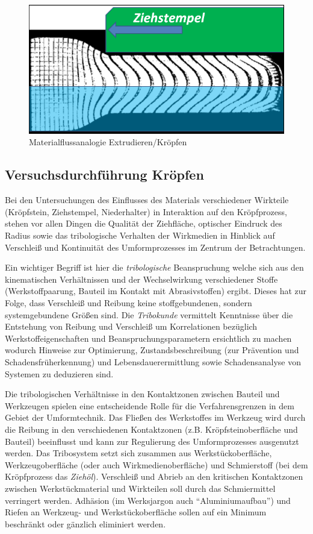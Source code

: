 \documentclass[12pt,a4paper,parskip,twoside,BCOR5mm,headsepline]{scrartcl}
\begin{document}
\begin{description*}
\begin{figure}[hbtp]
\centering
\includegraphics[width=.8\textwidth]{materialflussvergleich}
\caption{Materialflussanalogie Extrudieren/Kröpfen \autocite[13.9]{kl}}
\label{fig:git}
\end{figure}



\subsection{Versuchsdurchführung Kröpfen}
Bei den Untersuchungen des Einflusses des Materials verschiedener Wirkteile (Kröpfstein, Ziehstempel, Niederhalter) in Interaktion  auf den Kröpfprozess, stehen vor allen Dingen die Qualität der Ziehfläche, optischer Eindruck des Radius  sowie das tribologische Verhalten der Wirkmedien in Hinblick auf Verschleiß und Kontinuität des Umformprozesses im Zentrum der Betrachtungen.

Ein wichtiger Begriff ist hier die \emph{tribologische} Beanspruchung welche sich aus den kinematischen Verhältnissen und der Wechselwirkung verschiedener Stoffe (Werkstoffpaarung, Bauteil im Kontakt mit Abrasivstoffen) ergibt. Dieses hat zur Folge, dass Verschleiß und Reibung keine stoffgebundenen, sondern systemgebundene Größen sind. Die \emph{Tribokunde} vermittelt Kenntnisse über die Entstehung von Reibung und Verschleiß um Korrelationen bezüglich Werkstoffeigenschaften und Beanspruchungsparametern ersichtlich zu machen wodurch Hinweise zur Optimierung, Zustandsbeschreibung (zur Prävention und Schadensfrüherkennung) und Lebensdauerermittlung sowie Schadensanalyse von Systemen zu deduzieren sind. \autocite[388-390]{wki}

Die tribologischen Verhältnisse in den Kontaktzonen zwischen Bauteil und Werkzeugen spielen eine entscheidende Rolle für die Verfahrensgrenzen in dem Gebiet der Umformtechnik. Das Fließen des Werkstoffes im Werkzeug wird durch die Reibung in den verschiedenen Kontaktzonen (z.B. Kröpfsteinoberfläche und Bauteil) beeinflusst und kann zur Regulierung des Umformprozesses ausgenutzt werden. Das Tribosystem setzt sich zusammen aus Werkstückoberfläche, Werkzeugoberfläche (oder auch Wirkmedienoberfläche) und Schmierstoff (bei dem Kröpfprozess das \emph{Ziehöl}). Verschleiß und Abrieb  an den kritischen Kontaktzonen zwischen Werkstückmaterial und Wirkteilen soll durch das Schmiermittel verringert werden. Adhäsion (im Werksjargon auch "`Aluminiumaufbau"') und Riefen  an Werkzeug- und Werkstückoberfläche sollen auf ein Minimum beschränkt oder gänzlich eliminiert werden. \autocite[516]{aa}


\end{description*}
\end{document}
